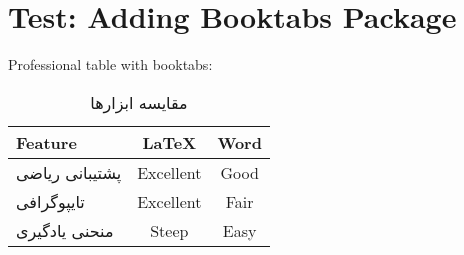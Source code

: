 \documentclass[12pt,a4paper]{article}
\newcommand{\fa}[1]{\textfarsi{#1}}
\newcommand{\en}[1]{\textenglish{#1}}
\begin{document}
\section*{Test: Adding Booktabs Package}

\en{Professional table with booktabs:}

\begin{table}[h]
\centering
\begin{tabular}{lcc}
\toprule
\en{Feature} & \en{LaTeX} & \en{Word} \\
\midrule
\fa{پشتیبانی ریاضی} & \en{Excellent} & \en{Good} \\
\fa{تایپوگرافی} & \en{Excellent} & \en{Fair} \\
\fa{منحنی یادگیری} & \en{Steep} & \en{Easy} \\
\bottomrule
\end{tabular}
\caption{\fa{مقایسه ابزارها}}
\end{table}
\end{document}
